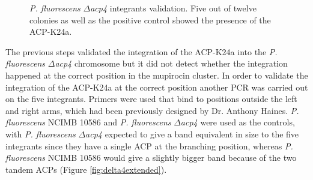 		\setlength\fboxsep{5pt}
		\setlength\fboxrule{1.5pt}
		\begin{figure}[htbp]
		\centering
		\caption[\textit{P. fluorescens} $ \Delta $\textit{acp4} integrants validation.]{\textit{P. fluorescens} $ \Delta $\textit{acp4} integrants validation. Five out of twelve colonies as well as the positive control showed the presence of the ACP-K24a.}
		\label{fig:delta4integrands}
		\end{figure}	
	
	The previous steps validated the integration of the ACP-K24a into the \textit{P. fluorescens} $ \Delta $\textit{acp4} chromosome but it did not detect whether the integration happened at the correct position in the mupirocin cluster. In order to validate the integration of the ACP-K24a at the correct position another PCR was carried out on the five integrants. Primers were used that bind to positions outside the left and right arms, which had been previously designed by Dr. Anthony Haines.  \textit{P. fluorescens} NCIMB 10586 and \textit{P. fluorescens} $ \Delta $\textit{acp4} were used as the controls, with \textit{P. fluorescens} $ \Delta $\textit{acp4} expected to give a band equivalent in size to the five integrants since they have a single ACP at the branching position, whereas \textit{P. fluorescens} NCIMB 10586 would give a slightly bigger band because of the two tandem ACPs (Figure \ref{fig:delta4extended}). 

